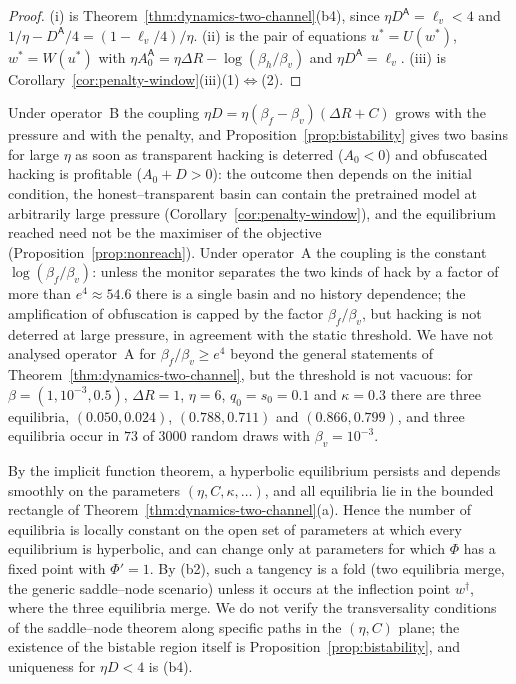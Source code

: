 \begin{proof}
(i) is Theorem~\ref{thm:dynamics-two-channel}(b4), since
$\eta D^{\mathsf A}=\ell_v<4$ and
$1/\eta-D^{\mathsf A}/4=(1-\ell_v/4)/\eta$. (ii) is the pair of equations
$u^\ast=U(w^\ast)$, $w^\ast=W(u^\ast)$ with
$\eta A_0^{\mathsf A}=\eta\Delta R-\log(\beta_h/\beta_v)$ and
$\eta D^{\mathsf A}=\ell_v$. (iii) is
Corollary~\ref{cor:penalty-window}(iii)(1)$\Leftrightarrow$(2).
\end{proof}

\begin{remark}\label{rem:A-vs-B}
Under operator~B the coupling $\eta D=\eta(\beta_f-\beta_v)(\Delta R+C)$
grows with the pressure and with the penalty, and
Proposition~\ref{prop:bistability} gives two basins for large $\eta$ as
soon as transparent hacking is deterred ($A_0<0$) and obfuscated hacking
is profitable ($A_0+D>0$): the outcome then depends on the initial
condition, the honest--transparent basin can contain the pretrained model
at arbitrarily large pressure
(Corollary~\ref{cor:penalty-window}), and the equilibrium reached need not
be the maximiser of the objective (Proposition~\ref{prop:nonreach}). Under
operator~A the coupling is the constant $\log(\beta_f/\beta_v)$: unless
the monitor separates the two kinds of hack by a factor of more than
$e^4\approx54.6$ there is a single basin and no history dependence; the
amplification of obfuscation is capped by the factor $\beta_f/\beta_v$,
but hacking is not deterred at large pressure, in agreement with the
static threshold. We have not analysed operator~A for
$\beta_f/\beta_v\ge e^4$ beyond the general statements of
Theorem~\ref{thm:dynamics-two-channel}, but the threshold is not vacuous: for $\beta=(1,10^{-3},0.5)$, $\Delta R=1$, $\eta=6$, $q_0=s_0=0.1$ and $\kappa=0.3$ there are three equilibria, $(0.050,0.024)$, $(0.788,0.711)$ and $(0.866,0.799)$, and three equilibria occur in $73$ of $3000$ random draws with $\beta_v=10^{-3}$.
\end{remark}

\begin{remark}[Bifurcations]\label{rem:saddle-node}
By the implicit function theorem, a hyperbolic equilibrium persists and
depends smoothly on the parameters $(\eta,C,\kappa,\dots)$, and all
equilibria lie in the bounded rectangle of
Theorem~\ref{thm:dynamics-two-channel}(a). Hence the number of equilibria
is locally constant on the open set of parameters at which every
equilibrium is hyperbolic, and can change only at parameters for which
$\Phi$ has a fixed point with $\Phi'=1$. By (b2), such a tangency is a fold
(two equilibria merge, the generic saddle--node scenario) unless it occurs
at the inflection point $w^\dagger$, where the three equilibria merge. We
do not verify the transversality conditions of the saddle--node theorem
along specific paths in the $(\eta,C)$ plane; the existence of the
bistable region itself is Proposition~\ref{prop:bistability}, and
uniqueness for $\eta D<4$ is (b4).
\end{remark}

